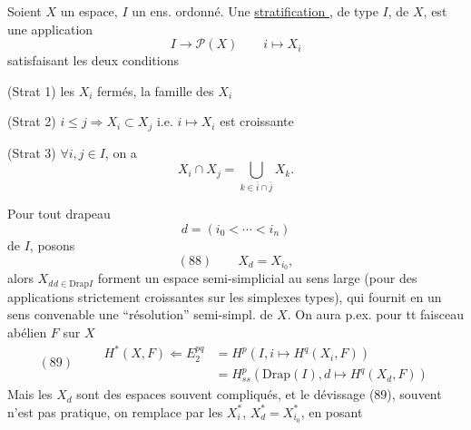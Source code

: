 
Soient $X$ un espace, $I$ un ens. ordonné.
Une \uline{stratification }, de type $I$, de $X$, est une application
\[I\longrightarrow\mathcal P(X)\qquad i\longmapsto X_i\]
satisfaisant les deux conditions

(Strat 1) les $X_i$ fermés, la famille des $X_i$  \uline{ }

(Strat 2) $i\leq j\Longrightarrow X_i\subset X_j$ i.e. $i\mapsto X_i$ est croissante

(Strat 3) $\forall i,j\in I$, on a
\[X_i\cap X_j=\bigcup_{k\in\bar i\cap\bar j}X_k.\]

Pour tout drapeau
\[d=(i_0<\cdots<i_n)\]
de $I$, posons
\[(88)\qquad X_d=X_{i_0},\]
alors  $X_d{}_{d\in\mathrm{Drap}I}$ forment un  espace semi-simplicial  au sens large (pour des applications strictement croissantes sur les simplexes types), qui fournit en un sens convenable une ``résolution'' semi-simpl. de $X$. On aura p.ex. pour tt faisceau abélien $F$ sur $X$
\[
(89)\qquad\begin{aligned}
H^*(X,F)\Longleftarrow E_2^{pq}&=H^p(I,i\mapsto H^q(X_i,F))\\
&=H^p_{ss}(\mathrm{Drap}(I),d\mapsto H^q(X_d,F))
\end{aligned}
\]
Mais les  $X_d$ sont des espaces souvent compliqués, et le dévissage (89), souvent n'est pas pratique, on remplace par les $X_i^*$, $X_d^*=X_{i_0}^*$, en posant
